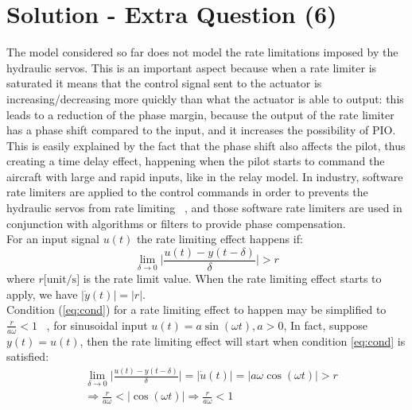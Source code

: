 \clearpage %

\section*{Solution - Extra Question (6)}
\label{sec:sol6}
The model considered so far does not model 	the rate limitations imposed by the hydraulic servos. This is an important aspect because when a rate limiter is saturated it means that the control signal sent to the actuator is increasing/decreasing more quickly than what the actuator is able to output: this leads to a reduction of the phase margin, because the output of the rate limiter has a phase shift compared to the input, and it increases the possibility of PIO.\\This is easily explained by the fact that the phase shift also affects the pilot, thus creating a time delay effect, happening when the pilot starts to command the aircraft with large and rapid inputs, like in the relay model. 
In industry, software rate limiters are applied to the control commands in order to prevents the hydraulic servos from rate limiting ~\cite[p. 3944]{paper3}, and those software rate limiters are used in conjunction with algorithms or filters to provide phase compensation. \\
For an input signal $u(t)$ the rate limiting effect happens if:
\begin{equation}\label{eq:cond} \lim_{\delta \to 0} \Big|\frac{u(t)-y(t-\delta)}{\delta}\Big|>r
\end{equation}
where $r \text{[unit/s]}$ is the rate limit value. When the rate limiting effect starts to apply, we have $|\dot{y}(t)| = |r|$.\\
Condition (\ref{eq:cond}) for a rate limiting effect to happen may be simplified to $\frac{r}{a\omega}<1$ ~\cite[p. 3945]{paper3}, for sinusoidal input $u(t)=a\sin(\omega t), a>0$,  In fact, suppose $y(t)=u(t)$,  then the rate limiting effect will start when condition \ref{eq:cond} is satisfied:
\begin{align*}
&\lim_{\delta \to 0} \Big|\frac{u(t)-y(t-\delta)}{\delta}\Big| = |\dot{u}(t)|  = |a \omega \cos(\omega t)| > r \\
&\Rightarrow \frac{r}{a \omega} < |\cos(\omega t)|  \Rightarrow \frac{r}{a \omega} < 1
\end{align*}
